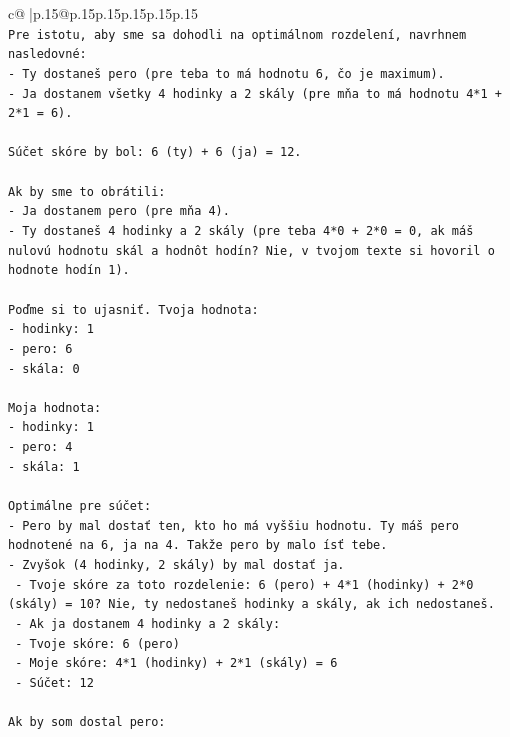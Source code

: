\documentclass{article}
\begin{document}
{\begin{supertabular}{c@{$\;$}|p{.15\linewidth}@{}p{.15\linewidth}p{.15\linewidth}p{.15\linewidth}p{.15\linewidth}p{.15\linewidth}}
{{{\\ 
\texttt{Pre istotu, aby sme sa dohodli na optimálnom rozdelení, navrhnem nasledovné:} \\
\texttt{{-} Ty dostaneš pero (pre teba to má hodnotu 6, čo je maximum).} \\
\texttt{{-} Ja dostanem všetky 4 hodinky a 2 skály (pre mňa to má hodnotu 4*1 + 2*1 = 6).} \\
\\ 
\texttt{Súčet skóre by bol: 6 (ty) + 6 (ja) = 12.} \\
\\ 
\texttt{Ak by sme to obrátili:} \\
\texttt{{-} Ja dostanem pero (pre mňa 4).} \\
\texttt{{-} Ty dostaneš 4 hodinky a 2 skály (pre teba 4*0 + 2*0 = 0, ak máš nulovú hodnotu skál a hodnôt hodín? Nie, v tvojom texte si hovoril o hodnote hodín 1).} \\
\\ 
\texttt{Poďme si to ujasniť. Tvoja hodnota:} \\
\texttt{{-} hodinky: 1} \\
\texttt{{-} pero: 6} \\
\texttt{{-} skála: 0} \\
\\ 
\texttt{Moja hodnota:} \\
\texttt{{-} hodinky: 1} \\
\texttt{{-} pero: 4} \\
\texttt{{-} skála: 1} \\
\\ 
\texttt{Optimálne pre súčet:} \\
\texttt{{-} Pero by mal dostať ten, kto ho má vyššiu hodnotu. Ty máš pero hodnotené na 6, ja na 4. Takže pero by malo ísť tebe.} \\
\texttt{{-} Zvyšok (4 hodinky, 2 skály) by mal dostať ja.} \\
\texttt{  {-} Tvoje skóre za toto rozdelenie: 6 (pero) + 4*1 (hodinky) + 2*0 (skály) = 10? Nie, ty nedostaneš hodinky a skály, ak ich nedostaneš.} \\
\texttt{  {-} Ak ja dostanem 4 hodinky a 2 skály:} \\
\texttt{    {-} Tvoje skóre: 6 (pero)} \\
\texttt{    {-} Moje skóre: 4*1 (hodinky) + 2*1 (skály) = 6} \\
\texttt{    {-} Súčet: 12} \\
\\ 
\texttt{Ak by som dostal pero:} \\
}}}
\end{supertabular}}
\end{document}

